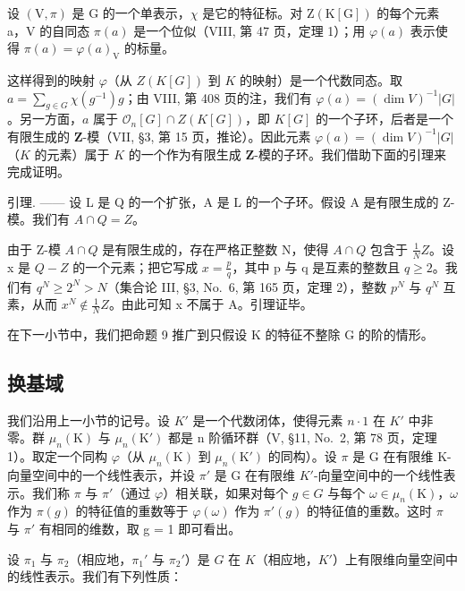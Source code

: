设 \((\mathrm{V},\pi)\) 是 G 的一个单表示，\(\chi\) 是它的特征标。对 \(\mathrm{Z}(\mathrm{K}[\mathrm{G}])\) 的每个元素 a，V 的自同态 \(\pi(a)\) 是一个位似（VIII, 第 47 页，定理 1）；用 \(\varphi(a)\) 表示使得 \(\pi(a)=\varphi(a)_{\mathrm{V}}\) 的标量。

这样得到的映射 \(\varphi\)（从 \(Z(K[G])\) 到 \(K\) 的映射）是一个代数同态。取 \(a = \sum_{g \in G} \chi(g^{-1})g\)；由 VIII, 第 408 页的注，我们有 \(\varphi(a) = (\dim V)^{-1}|G|\)。另一方面，\(a\) 属于 \(\mathcal{O}_n[G] \cap Z(K[G])\)，即 \(K[G]\) 的一个子环，后者是一个有限生成的 \(\mathbf{Z}\)-模（VII, §3, 第 15 页，推论）。因此元素 \(\varphi(a) = (\dim V)^{-1}|G|\)（\(K\) 的元素）属于 \(K\) 的一个作为有限生成 \(\mathbf{Z}\)-模的子环。我们借助下面的引理来完成证明。

引理. —— 设 L 是 Q 的一个扩张，A 是 L 的一个子环。假设 A 是有限生成的 Z-模。我们有 \(A \cap Q = Z\)。

由于 Z-模 \(A \cap Q\) 是有限生成的，存在严格正整数 N，使得 \(A \cap Q\) 包含于 \(\frac{1}{N}Z\)。设 x 是 \(Q - Z\) 的一个元素；把它写成 \(x = \frac{p}{q}\)，其中 p 与 q 是互素的整数且 \(q \geqslant 2\)。我们有 \(q^{N} \geqslant 2^{N} > N\)（集合论 III, §3, No.~6, 第 165 页，定理 2），整数 \(p^{N}\) 与 \(q^{N}\) 互素，从而 \(x^{N} \notin \frac{1}{N}Z\)。由此可知 x 不属于 A。引理证毕。

在下一小节中，我们把命题 9 推广到只假设 K 的特征不整除 G 的阶的情形。

\subsection{换基域}

我们沿用上一小节的记号。设 \(K'\) 是一个代数闭体，使得元素 \(n \cdot 1\) 在 \(K'\) 中非零。群 \(\mu_{n}(\mathrm{K})\) 与 \(\mu_{n}(\mathrm{K}')\) 都是 n 阶循环群（V, §11, No.~2, 第 78 页，定理 1）。取定一个同构 \(\varphi\)（从 \(\mu_{n}(\mathrm{K})\) 到 \(\mu_{n}(\mathrm{K}')\) 的同构）。设 \(\pi\) 是 G 在有限维 K-向量空间中的一个线性表示，并设 \(\pi'\) 是 G 在有限维 \(K'\)-向量空间中的一个线性表示。我们称 \(\pi\) 与 \(\pi'\)（通过 \(\varphi\)）相关联，如果对每个 \(g \in G\) 与每个 \(\omega \in \mu_{n}(\mathrm{K})\)，\(\omega\) 作为 \(\pi(g)\) 的特征值的重数等于 \(\varphi(\omega)\) 作为 \(\pi'(g)\) 的特征值的重数。这时 \(\pi\) 与 \(\pi'\) 有相同的维数，取 g = 1 即可看出。

设 \(\pi_1\) 与 \(\pi_2\)（相应地，\(\pi_1'\) 与 \(\pi_2'\)）是 \(G\) 在 \(K\)（相应地，\(K'\)）上有限维向量空间中的线性表示。我们有下列性质：

